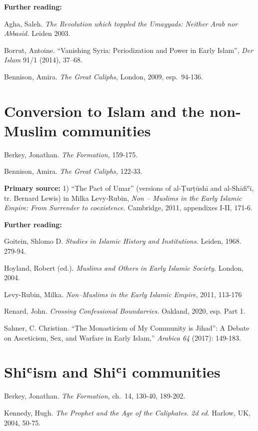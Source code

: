 \documentclass[
]{book}
\begin{document}
\textbf{Further reading:}

Agha, Saleh. \emph{The Revolution which toppled the Umayyads: Neither Arab nor Abbasid.} Leiden 2003.

Borrut, Antoine. ``Vanishing Syria: Periodization and Power in Early Islam'', \emph{Der Islam} 91/1 (2014), 37--68.

Bennison, Amira. \emph{The Great Caliphs,} London, 2009, esp.~94-136.

\hypertarget{conversion-to-islam-and-the-non-muslim-communities}{%
\chapter{Conversion to Islam and the non-Muslim communities}\label{conversion-to-islam-and-the-non-muslim-communities}}

Berkey, Jonathan. \emph{The Formation,} 159-175.

Bennison, Amira. \emph{The Great Caliphs,} 122-33.

\textbf{Primary source:} 1) ``The Pact of Umar'' (versions of al-Ṭurṭūshī and
al-Shāfiʿī, tr. Bernard Lewis) in Milka Levy-Rubin, \emph{Non -- Muslims in
the Early Islamic Empire: From Surrender to coexistence.} Cambridge,
2011, appendixes I-II, 171-6.

\textbf{Further reading:}

Goitein, Shlomo D. \emph{Studies in Islamic History and Institutions.}
Leiden, 1968. 279-94.

Hoyland, Robert (ed.). \emph{Muslims and Others in Early Islamic Society.}
London, 2004.

Levy-Rubin, Milka. \emph{Non--Muslims in the Early Islamic Empire}, 2011,
113-176

Renard, John. \emph{Crossing Confessional Boundarries.} Oakland, 2020, esp.
Part 1.

Sahner, C. Christian. ``The Monasticism of My Community is Jihad'': A
Debate on Asceticism, Sex, and Warfare in Early Islam,'' \emph{Arabica 64}
(2017): 149-183.

\hypertarget{shiux2bfism-and-shiux2bfi-communities}{%
\chapter{Shiʿism and Shiʿi communities}\label{shiux2bfism-and-shiux2bfi-communities}}

Berkey, Jonathan. \emph{The Formation,} ch.~14, 130-40, 189-202.

Kennedy, Hugh. \emph{The Prophet and the Age of the Caliphates. 2d ed.}
Harlow, UK, 2004, 50-75.
\end{document}
